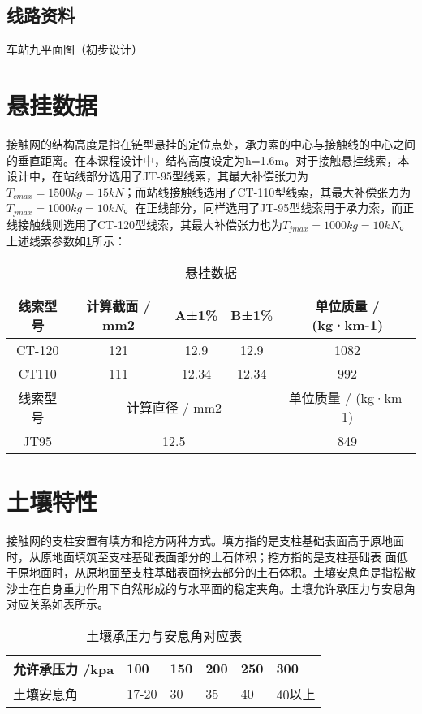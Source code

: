\subsection{线路资料}
车站九平面图（初步设计）

\section{悬挂数据}
接触网的结构高度是指在链型悬挂的定位点处，承力索的中心与接触线的中心之间的垂直距离。在本课程设计中，结构高度设定为h=1.6m。对于接触悬挂线索，本设计中，在站线部分选用了JT-95型线索，其最大补偿张力为$T_{cmax}=1500kg=15kN$；而站线接触线选用了CT-110型线索，其最大补偿张力为$T_{jmax}=1000kg=10kN$。在正线部分，同样选用了JT-95型线索用于承力索，而正线接触线则选用了CT-120型线索，其最大补偿张力也为$T_{jmax}=1000kg=10kN$。上述线索参数如\ref{tab:悬挂数据}所示：

\begin{table}[h]
	\centering
	\caption{悬挂数据}
	\label{tab:悬挂数据}

		\begin{tabular}{|c|ccc|c|}
			\hline
			线索型号 & \multicolumn{1}{c|}{计算截面 / mm2} & \multicolumn{1}{c|}{A±1\%} & B±1\% & 单位质量 / (kg·km-1) \\ \hline
			CT-120 & \multicolumn{1}{c|}{121} & \multicolumn{1}{c|}{12.9}  & 12.9  & 1082             \\ \hline
			CT110  & \multicolumn{1}{c|}{111} & \multicolumn{1}{c|}{12.34} & 12.34 & 992              \\ \hline
			线索型号   & \multicolumn{3}{c|}{计算直径 / mm2}                               & 单位质量 / (kg·km-1) \\ \hline
			JT95   & \multicolumn{3}{c|}{12.5}                                     & 849              \\ \hline
		\end{tabular}%
	
\end{table}

\section{土壤特性}

接触网的支柱安置有填方和挖方两种方式。填方指的是支柱基础表面高于原地面时，从原地面填筑至支柱基础表面部分的土石体积；挖方指的是支柱基础表
面低于原地面时，从原地面至支柱基础表面挖去部分的土石体积。土壤安息角是指松散沙土在自身重力作用下自然形成的与水平面的稳定夹角。土壤允许承压力与安息角对应关系如表所示。
\begin{table}[h]
	\centering
	\caption{土壤承压力与安息角对应表}
	\begin{tabular}{llllll}
		\hline
		允许承压力 /kpa & 100  & 150 & 200 & 250 & 300 \\ \hline
		土壤安息角  & 17-20 & 30 & 35 & 40 & 40以上 \\ \hline
	\end{tabular}
	\label{土壤承压力与安息角对应表}
\end{table}


